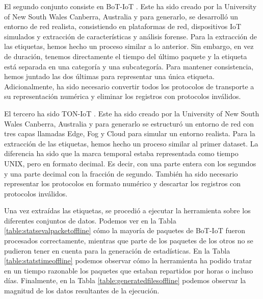 \documentclass[10pt,a4paper,twoside]{article}
\begin{document}
\begin{multicols*}{2}
    El segundo conjunto consiste en BoT-IoT \cite{DBLP:journals/corr/abs-1811-00701}. Este ha sido creado por la University of New South Wales Canberra, Australia y para generarlo, se desarrolló un entorno de red realista, consistiendo en plataformas de red, dispositivos IoT simulados y extracción de características y análisis forense. Para la extracción de las etiquetas, hemos hecho un proceso similar a lo anterior. Sin embargo, en vez de duración, tenemos directamente el tiempo del último paquete y la etiqueta está separada en una categoría y una subcategoría. Para mantener consistencia, hemos juntado las dos últimas para representar una única etiqueta. Adicionalmente, ha sido necesario convertir todos los protocolos de transporte a su representación numérica y eliminar los registros con protocolos inválidos.
    
    El tercero ha sido TON-IoT \cite{MOUSTAFA2021102994}. Este ha sido creado por la University of New South Wales Canberra, Australia y para generarlo se estructuró un entorno de red con tres capas llamadas Edge, Fog y Cloud para simular un entorno realista. Para la extracción de las etiquetas, hemos hecho un proceso similar al primer dataset. La diferencia ha sido que la marca temporal estaba representada como tiempo UNIX, pero en formato decimal. Es decir, con una parte entera con los segundos y una parte decimal con la fracción de segundo. También ha sido necesario representar los protocolos en formato numérico y descartar los registros con protocolos inválidos.

    Una vez extraídas las etiquetas, se procedió a ejecutar la herramienta sobre los diferentes conjuntos de datos. Podemos ver en la Tabla \ref{table:statsevalpacketoffline} cómo la mayoría de paquetes de BoT-IoT fueron procesados correctamente, mientras que parte de los paquetes de los otros no se pudieron tener en cuenta para la generación de estadísticas. En la Tabla \ref{table:statstimeoffline} podemos observar cómo la herramienta ha podido tratar en un tiempo razonable los paquetes que estaban repartidos por horas o incluso días. Finalmente, en la Tabla \ref{table:generatedfilesoffline} podemos observar la magnitud de los datos resultantes de la ejecución.

    \begin{table}[H]
        \begin{center}
        \end{center}
        \caption{Paquetes procesados y válidos en el análisis}
        \label{table:statsevalpacketoffline}
    \end{table}


\end{multicols*}
\end{document}
